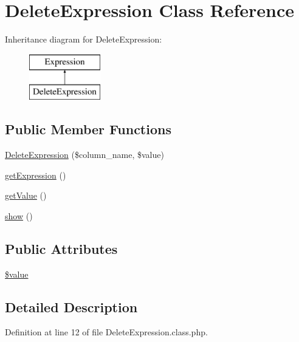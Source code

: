 \hypertarget{classDeleteExpression}{\section{Delete\+Expression Class Reference}
\label{classDeleteExpression}
}
Inheritance diagram for Delete\+Expression\+:\begin{figure}[H]
\begin{center}
\leavevmode
\includegraphics[height=2.000000cm]{classDeleteExpression}
\end{center}
\end{figure}
\subsection*{Public Member Functions}
\begin{DoxyCompactItemize}
\item 
\hyperlink{classDeleteExpression_a1749423fab43333921d29c288a5c1b89}{Delete\+Expression} (\$column\+\_\+name, \$value)
\item 
\hyperlink{classDeleteExpression_acf2477afffe27b73797829c852431aec}{get\+Expression} ()
\item 
\hyperlink{classDeleteExpression_a37759c2867e64b62368539706fdf9a43}{get\+Value} ()
\item 
\hyperlink{classDeleteExpression_a6e7d4bdf884830a90e0ed0aba7619f67}{show} ()
\end{DoxyCompactItemize}
\subsection*{Public Attributes}
\begin{DoxyCompactItemize}
\item 
\hyperlink{classDeleteExpression_a8e5b6ee335281d42c6e40a462b83cf64}{\$value}
\end{DoxyCompactItemize}


\subsection{Detailed Description}


Definition at line 12 of file Delete\+Expression.\+class.\+php.



